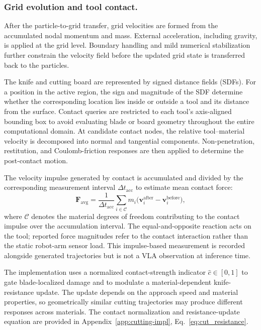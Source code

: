 \subsubsection{Grid evolution and tool contact.}
After the particle-to-grid transfer, grid velocities are formed from the accumulated nodal momentum and mass. External acceleration, including gravity, is applied at the grid level. Boundary handling and mild numerical stabilization further constrain the velocity field before the updated grid state is transferred back to the particles.

The knife and cutting board are represented by signed distance fields (SDFs). For a position in the active region, the sign and magnitude of the SDF determine whether the corresponding location lies inside or outside a tool and its distance from the surface. Contact queries are restricted to each tool's axis-aligned bounding box to avoid evaluating blade or board geometry throughout the entire computational domain. At candidate contact nodes, the relative tool--material velocity is decomposed into normal and tangential components. Non-penetration, restitution, and Coulomb-friction responses are then applied to determine the post-contact motion.

The velocity impulse generated by contact is accumulated and divided by the corresponding measurement interval $\Delta t_{\mathrm{acc}}$ to estimate mean contact force:
\begin{equation}\label{eq:force}
  \mathbf{F}_{\mathrm{avg}}=
  \frac{1}{\Delta t_{\mathrm{acc}}}
  \sum_{i\in\mathcal{C}}m_i
  \bigl(\mathbf{v}_i^{\mathrm{after}}-\mathbf{v}_i^{\mathrm{before}}\bigr),
\end{equation}
where $\mathcal{C}$ denotes the material degrees of freedom contributing to the contact impulse over the accumulation interval. The equal-and-opposite reaction acts on the tool; reported force magnitudes refer to the contact interaction rather than the static robot-arm sensor load. This impulse-based measurement is recorded alongside generated trajectories but is not a VLA observation at inference time.

The implementation uses a normalized contact-strength indicator $\hat c\in[0,1]$ to gate blade-localized damage and to modulate a material-dependent knife-resistance update. The update depends on the approach speed and material properties, so geometrically similar cutting trajectories may produce different responses across materials. The contact normalization and resistance-update equation are provided in Appendix~\ref{app:cutting-impl}, Eq.~\eqref{eq:cut_resistance}.

